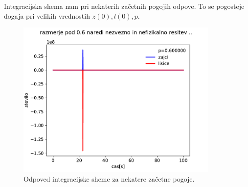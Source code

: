 \documentclass[11pt, a4paper]{article}
\begin{document}
Integracijska shema nam pri nekaterih začetnih pogojih odpove. To se pogosteje dogaja pri velikih vrednostih $z(0),l(0),p$.\newpage
\begin{figure}[htb!]
  \centering
  \includegraphics[width=10cm]{zajci_nefizikalna_resitev.pdf}
  \caption{Odpoved integracijske sheme za nekatere začetne pogoje.}
\end{figure}
\end{document}
